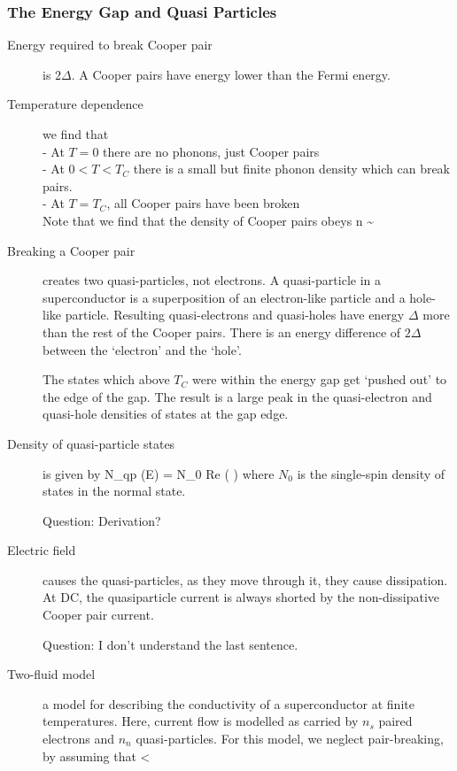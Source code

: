 \subsubsection{The Energy Gap and Quasi Particles}
\begin{description}

\item[Energy required to break Cooper pair] is $2\Delta$. A Cooper pairs have energy lower than the Fermi energy. 

\item[Temperature dependence] we find that\\
- At $T = 0$ there are no phonons, just Cooper pairs \\
- At $0 < T< T_C$ there is a small but finite phonon density which can break pairs.  \\
- At $T = T_C$, all Cooper pairs have been broken \\

Note that we find that the density of Cooper pairs obeys
\beq
n \sim {}
\eeq

\item[Breaking a Cooper pair] creates two quasi-particles, not electrons. A quasi-particle in a superconductor is a superposition of an electron-like particle and a hole-like particle. Resulting quasi-electrons and quasi-holes have energy $\Delta $ more than the rest of the Cooper pairs. There is an energy difference of $2\Delta$ between the `electron' and the `hole'. 

The states which above $T_C$ were within the energy gap get `pushed out' to the edge of the gap. The result is a large peak in the quasi-electron and quasi-hole densities of states at the gap edge.  

\item[Density of quasi-particle states] is given by
\beq
N_{qp} (E) = N_0 \mbox{Re} \left( \right)
\eeq
where $N_0$ is the single-spin density of states in the normal state. 

Question: Derivation?

\item[Electric field] causes the quasi-particles, as they move through it, they cause dissipation. At DC, the quasiparticle current is always shorted by the non-dissipative Cooper pair current. 

Question: I don't understand the last sentence. 

\item[Two-fluid model] a model for describing the conductivity of a superconductor at finite temperatures. Here, current flow is modelled as carried by $n_s$ paired electrons and $n_n$ quasi-particles. For this model, we neglect pair-breaking, by assuming that 
\beq
\frac{\omega}{2\pi} < 
\eeq


\end{description}
